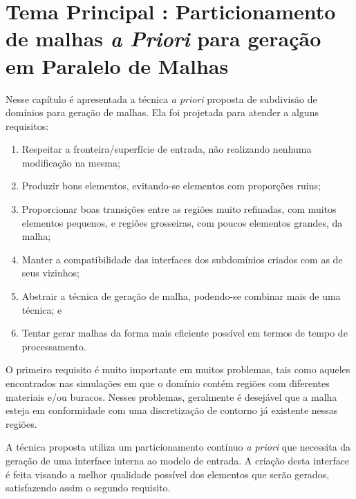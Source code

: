 \chapter{Tema Principal : Particionamento de malhas \textit{a Priori} para geração em Paralelo de Malhas}\label{tema1}

Nesse capítulo é apresentada a técnica \textit{a priori} proposta de subdivisão de domínios para geração de malhas. Ela foi projetada para atender a alguns requisitos:

\begin{enumerate}
	\item Respeitar a fronteira/superfície de entrada, não realizando nenhuma modificação na mesma;
	
	\item Produzir bons elementos, evitando-se elementos com proporções ruins;
	
	\item Proporcionar boas transições entre as regiões muito refinadas, com muitos elementos pequenos, e regiões grosseiras, com poucos elementos grandes, da malha;
	
	\item Manter a compatibilidade das interfaces dos subdomínios criados com as de seus vizinhos;
	
	\item Abstrair a técnica de geração de malha, podendo-se combinar mais de uma técnica; e
	
	
	\item Tentar gerar malhas da forma mais eficiente possível em termos de tempo de processamento.
\end{enumerate}


O primeiro requisito é muito importante em muitos problemas, tais como aqueles encontrados nas simulações em que o domínio contém regiões com diferentes materiais e/ou buracos. Nesses problemas, geralmente é desejável que a malha esteja em conformidade com uma discretização de contorno já existente nessas regiões.

A técnica proposta utiliza um particionamento contínuo \textit{a priori} que necessita da geração de uma interface interna ao modelo de entrada. A criação desta interface é feita visando a melhor qualidade possível dos elementos que serão gerados, satisfazendo assim o segundo requisito.

